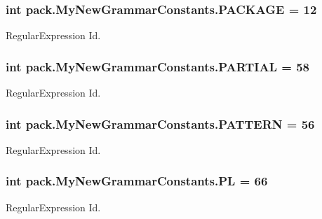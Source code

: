 \subsubsection[{\texorpdfstring{P\+A\+C\+K\+A\+GE}{PACKAGE}}]{\setlength{\rightskip}{0pt plus 5cm}int pack.\+My\+New\+Grammar\+Constants.\+P\+A\+C\+K\+A\+GE = 12}\hypertarget{interfacepack_1_1_my_new_grammar_constants_a24ee37be46c7521c370cdd3fe0d1c21a}{}\label{interfacepack_1_1_my_new_grammar_constants_a24ee37be46c7521c370cdd3fe0d1c21a}
Regular\+Expression Id. 
\subsubsection[{\texorpdfstring{P\+A\+R\+T\+I\+AL}{PARTIAL}}]{\setlength{\rightskip}{0pt plus 5cm}int pack.\+My\+New\+Grammar\+Constants.\+P\+A\+R\+T\+I\+AL = 58}\hypertarget{interfacepack_1_1_my_new_grammar_constants_ac8b98c173417f92a7e0905f668773fe7}{}\label{interfacepack_1_1_my_new_grammar_constants_ac8b98c173417f92a7e0905f668773fe7}
Regular\+Expression Id. 
\subsubsection[{\texorpdfstring{P\+A\+T\+T\+E\+RN}{PATTERN}}]{\setlength{\rightskip}{0pt plus 5cm}int pack.\+My\+New\+Grammar\+Constants.\+P\+A\+T\+T\+E\+RN = 56}\hypertarget{interfacepack_1_1_my_new_grammar_constants_a648c013eecba49b920c0db775c504bed}{}\label{interfacepack_1_1_my_new_grammar_constants_a648c013eecba49b920c0db775c504bed}
Regular\+Expression Id. 
\subsubsection[{\texorpdfstring{PL}{PL}}]{\setlength{\rightskip}{0pt plus 5cm}int pack.\+My\+New\+Grammar\+Constants.\+PL = 66}\hypertarget{interfacepack_1_1_my_new_grammar_constants_a9f22ad110480225b13fff29cda9ad1ba}{}\label{interfacepack_1_1_my_new_grammar_constants_a9f22ad110480225b13fff29cda9ad1ba}
Regular\+Expression Id. 

